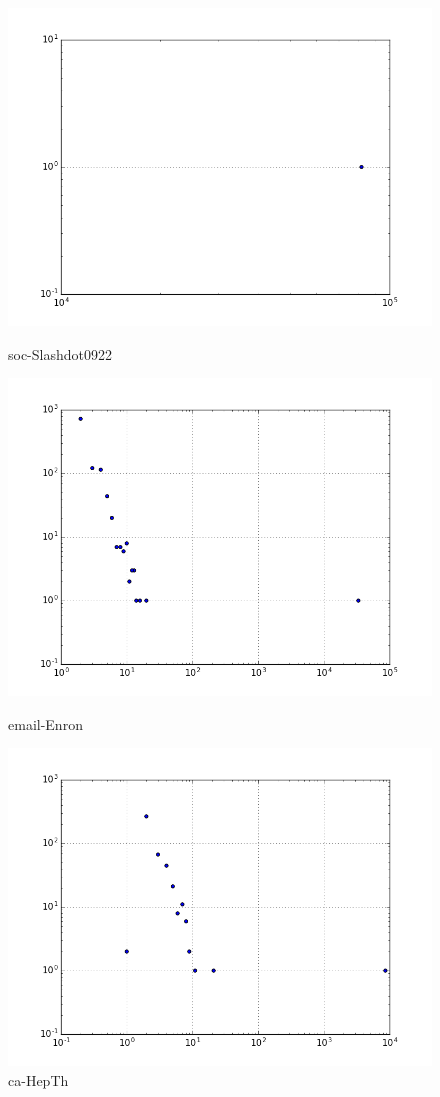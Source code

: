 \begin{figure}[H]
  \includegraphics[width=\linewidth]{img/slashDot09/comp_dist.png}
  \caption*{soc-Slashdot0922}
\endminipage\hfill
{}
  \includegraphics[width=\linewidth]{img/email/comp_dist.png}
  \caption*{email-Enron}
\endminipage\hfill
{}
  \includegraphics[width=\linewidth]{img/ca-HepTh/comp_dist.png}
  \caption*{ca-HepTh}
\endminipage
\end{figure}
